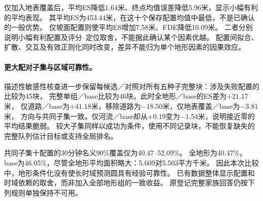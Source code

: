 仅加入地表覆盖后，平均ES降低1.64米、终点均值误差降低5.96米，显示小幅有利的平均表现。
其平均ES为453.44米，在这十个保存配置均值中最低，不是已确认的一般优势。
仅坡面配置则使平均ES增加7.58米、FDE降低10.09米。
二者分别说明小幅有利配置及评分--定位取舍，不能据此确认某个因素优越。
配置间拟合、扩散、交互及有效正则化同时改变，差异不能归为单个地形因素的因果效应。

\paragraph{更大配对子集与区域可靠性。}
描述性敏感性核查进一步保留每候选／对照对所有五种子完整块：涉及失败配置的比较为45块，
完整单组／base比较为46块。此时全地形／base的ES差为$+21.17$米，
仅道路／base为$+41.18$米，移除道路为$-18.50$米，仅地表覆盖／base为$-3.81$米，
方向与共同子集一致。仅河流／base却从$+0.19$变为$-1.54$米，说明接近零的平均结果脆弱。
较大子集同样以成功为条件，使用不同记录块，不能恢复缺失的完整队列估计目标或支持全局排名。

共同子集十配置的30分钟名义90\%覆盖仅为40.47--52.09\%。
全地形为40.47\%，base为46.05\%，尽管全地形平均面积略大：5.609对5.503平方千米。
因此本次比较中，地形条件化没有使长时域预测圆具有经验可靠性。
已有数据整体显示配置和时域依赖的取舍，而非加入全部地形组的一致收益。
原登记完整家族回答仍按下列规则单独保持不可用。
